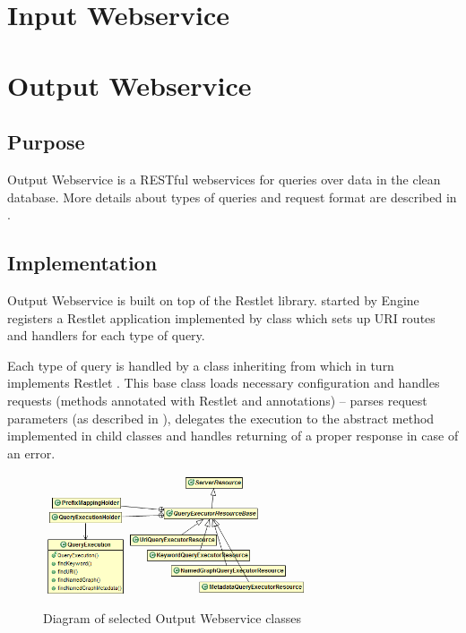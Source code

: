 \section{Input Webservice}

\section{Output Webservice}
\subsection{Purpose}
Output Webservice is a RESTful webservices for queries over data in the clean database. More details about types of queries and request format are described in .

\subsection{Implementation}
Output Webservice is built on top of the Restlet library.  started by Engine registers a Restlet application implemented by class  which sets up URI routes and handlers for each type of query.

Each type of query is handled by a class inheriting from  which in turn implements Restlet . This base class loads necessary configuration and handles requests (methods annotated with Restlet  and  annotations) -- parses request parameters (as described in ), delegates the execution to the abstract  method implemented in child classes and handles returning of a proper response in case of an error.

\begin{figure}[htb]
    \centering
    \includegraphics[width=0.7\textwidth]{images/dia-outputws-resources.png}
    \caption{Diagram of selected Output Webservice classes}
	\label{fig:outputwsResources}
\end{figure}


